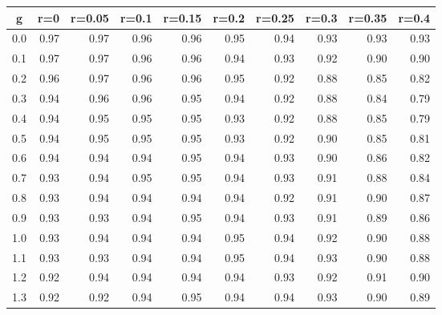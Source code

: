 %
\begin{table}[!tbp]
 \begin{center}
 \begin{tabular}{rrrrrrrrrr}\hline\hline
\multicolumn{1}{c}{g}&\multicolumn{1}{c}{r=0}&\multicolumn{1}{c}{r=0.05}&\multicolumn{1}{c}{r=0.1}&\multicolumn{1}{c}{r=0.15}&\multicolumn{1}{c}{r=0.2}&\multicolumn{1}{c}{r=0.25}&\multicolumn{1}{c}{r=0.3}&\multicolumn{1}{c}{r=0.35}&\multicolumn{1}{c}{r=0.4}\tabularnewline
\hline
0.0&0.97&0.97&0.96&0.96&0.95&0.94&0.93&0.93&0.93\tabularnewline
0.1&0.97&0.97&0.96&0.96&0.94&0.93&0.92&0.90&0.90\tabularnewline
0.2&0.96&0.97&0.96&0.96&0.95&0.92&0.88&0.85&0.82\tabularnewline
0.3&0.94&0.96&0.96&0.95&0.94&0.92&0.88&0.84&0.79\tabularnewline
0.4&0.94&0.95&0.95&0.95&0.93&0.92&0.88&0.85&0.79\tabularnewline
0.5&0.94&0.95&0.95&0.95&0.93&0.92&0.90&0.85&0.81\tabularnewline
0.6&0.94&0.94&0.94&0.95&0.94&0.93&0.90&0.86&0.82\tabularnewline
0.7&0.93&0.94&0.95&0.95&0.94&0.93&0.91&0.88&0.84\tabularnewline
0.8&0.93&0.94&0.94&0.94&0.94&0.92&0.91&0.90&0.87\tabularnewline
0.9&0.93&0.93&0.94&0.95&0.94&0.93&0.91&0.89&0.86\tabularnewline
1.0&0.93&0.94&0.94&0.94&0.95&0.94&0.92&0.90&0.88\tabularnewline
1.1&0.93&0.93&0.94&0.94&0.95&0.94&0.93&0.90&0.88\tabularnewline
1.2&0.92&0.94&0.94&0.94&0.94&0.93&0.92&0.91&0.90\tabularnewline
1.3&0.92&0.92&0.94&0.95&0.94&0.94&0.93&0.90&0.89\tabularnewline
\hline
\end{tabular}

\end{center}

\end{table}


